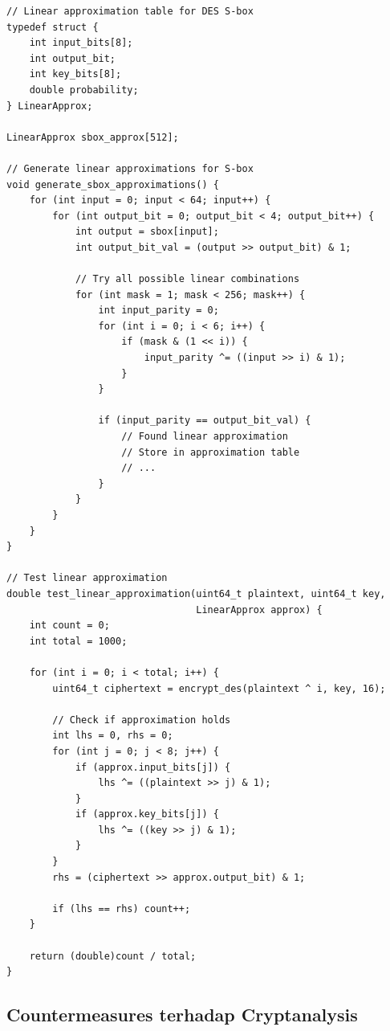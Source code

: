 \begin{lstlisting}[style=cstyle, caption={Linear Approximation Analysis}]
// Linear approximation table for DES S-box
typedef struct {
    int input_bits[8];
    int output_bit;
    int key_bits[8];
    double probability;
} LinearApprox;

LinearApprox sbox_approx[512];

// Generate linear approximations for S-box
void generate_sbox_approximations() {
    for (int input = 0; input < 64; input++) {
        for (int output_bit = 0; output_bit < 4; output_bit++) {
            int output = sbox[input];
            int output_bit_val = (output >> output_bit) & 1;
            
            // Try all possible linear combinations
            for (int mask = 1; mask < 256; mask++) {
                int input_parity = 0;
                for (int i = 0; i < 6; i++) {
                    if (mask & (1 << i)) {
                        input_parity ^= ((input >> i) & 1);
                    }
                }
                
                if (input_parity == output_bit_val) {
                    // Found linear approximation
                    // Store in approximation table
                    // ...
                }
            }
        }
    }
}

// Test linear approximation
double test_linear_approximation(uint64_t plaintext, uint64_t key, 
                                 LinearApprox approx) {
    int count = 0;
    int total = 1000;
    
    for (int i = 0; i < total; i++) {
        uint64_t ciphertext = encrypt_des(plaintext ^ i, key, 16);
        
        // Check if approximation holds
        int lhs = 0, rhs = 0;
        for (int j = 0; j < 8; j++) {
            if (approx.input_bits[j]) {
                lhs ^= ((plaintext >> j) & 1);
            }
            if (approx.key_bits[j]) {
                lhs ^= ((key >> j) & 1);
            }
        }
        rhs = (ciphertext >> approx.output_bit) & 1;
        
        if (lhs == rhs) count++;
    }
    
    return (double)count / total;
}
\end{lstlisting}

\subsection{Countermeasures terhadap Cryptanalysis}

